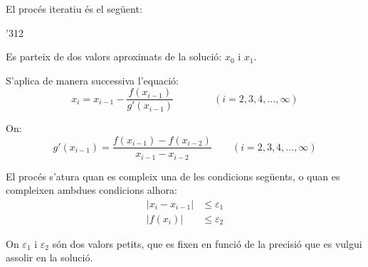 El proc\'{e}s iteratiu \'{e}s el seg\"{u}ent:

\begin{dingautolist}{'312}
    \item Es parteix de dos valors aproximats de la soluci\'{o}: $x_0$ i $x_1$.

    \item   S'aplica de manera successiva l'equaci\'{o}:
            \begin{equation}\label{eq:secant-1}
              x_i = x_{i-1} - \frac{f(x_{i-1})}{g'(x_{i-1})} \qquad\qquad (i=2,3,4,\dots,\infty)
            \end{equation}

            On:
            \begin{equation}\label{eq:secant-2}
              g'(x_{i-1}) = \frac{f(x_{i-1}) - f(x_{i-2}) } {x_{i-1} - x_{i-2}} \qquad (i=2,3,4,\dots,\infty)
            \end{equation}

    \item   El proc\'{e}s s'atura quan es compleix una de les condicions seg\"{u}ents, o quan es compleixen ambdues condicions alhora:
            \begin{subequations}\begin{align}
              |x_i - x_{i-1}| &\leq \varepsilon_1 \\
              |f(x_i)| &\leq \varepsilon_2
            \end{align}\end{subequations}

            On $\varepsilon_1$ i $\varepsilon_2$ s\'{o}n dos valors petits, que es fixen en funci\'{o} de la precisi\'{o} que es vulgui assolir en la soluci\'{o}.
\end{dingautolist}

